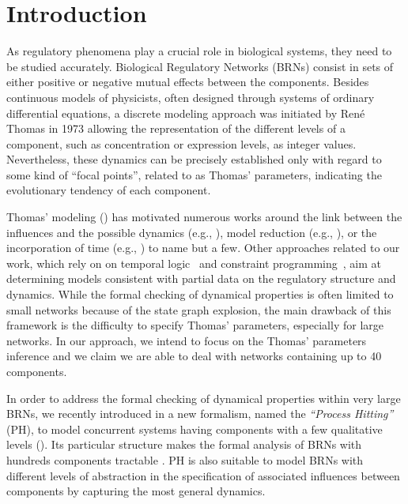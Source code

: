 \section{Introduction}
As regulatory phenomena play a crucial role in biological systems, they need to be studied accurately.
Biological Regulatory Networks (BRNs) consist in sets of either positive or negative mutual effects between the components.
Besides continuous models of physicists, often designed through systems of ordinary
differential equations, a discrete modeling approach was initiated by René Thomas in 1973
\cite{Thomas73} allowing the representation of the different levels of a component, such as concentration or expression levels, as integer values.
Nevertheless, these dynamics can be precisely established only with regard to some kind of ``focal points'', related to as Thomas' parameters, indicating the evolutionary tendency of each component.

Thomas' modeling () has motivated numerous works around the link between the influences
and the possible dynamics (e.g., \cite{RiCo07}), %
model reduction (e.g., \cite{Naldi09}), %
or the incorporation of time (e.g., \cite{Siebert06,Ahmad08}) %
to name but a few.
Other approaches related to our work, which rely on on temporal logic~\cite{Khalis09} and constraint programming~\cite{20646302,DBLP:conf/ipcat/CorblinFTCT12},
aim at determining models consistent with partial data on the regulatory structure and dynamics.
While the formal checking of dynamical properties is often limited to small networks because of the
state graph explosion, the main drawback of this framework is the difficulty to specify Thomas'
parameters, especially for large networks.
In our approach, we intend to focus on the Thomas' parameters inference and we claim we are able to deal with networks containing up to 40 components.

In order to address the formal checking of dynamical properties within very large BRNs, we recently
introduced in \cite{PMR10-TCSB} a new formalism, named the \emph{``Process Hitting''} (PH), to model
concurrent systems having components with a few qualitative levels ().
Its particular structure makes the formal analysis of BRNs with hundreds components tractable \cite{PMR12-MSCS}.
PH is also suitable to model BRNs with different levels of abstraction in the specification of
associated influences between components by capturing the most general dynamics.

